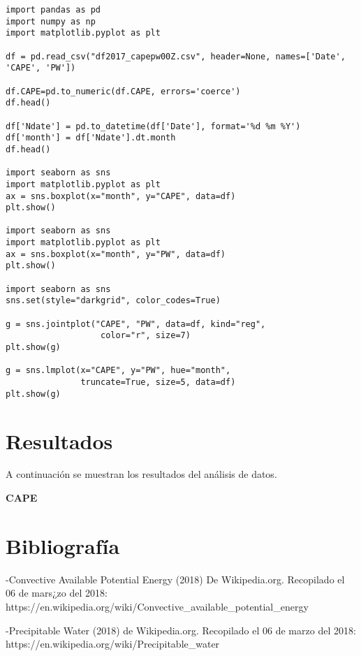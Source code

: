 \documentclass[12pt]{article}
\begin{document}
\begin{verbatim}
import pandas as pd
import numpy as np
import matplotlib.pyplot as plt

df = pd.read_csv("df2017_capepw00Z.csv", header=None, names=['Date', 'CAPE', 'PW'])

df.CAPE=pd.to_numeric(df.CAPE, errors='coerce')
df.head()

df['Ndate'] = pd.to_datetime(df['Date'], format='%d %m %Y')
df['month'] = df['Ndate'].dt.month
df.head()

import seaborn as sns
import matplotlib.pyplot as plt
ax = sns.boxplot(x="month", y="CAPE", data=df)
plt.show()

import seaborn as sns
import matplotlib.pyplot as plt
ax = sns.boxplot(x="month", y="PW", data=df)
plt.show()

import seaborn as sns
sns.set(style="darkgrid", color_codes=True)

g = sns.jointplot("CAPE", "PW", data=df, kind="reg",
                   color="r", size=7)
plt.show(g)

g = sns.lmplot(x="CAPE", y="PW", hue="month",
               truncate=True, size=5, data=df)
plt.show(g)
\end{verbatim}

\section{Resultados}

A continuación se muestran los resultados del análisis de datos.

\textbf{CAPE}


\section{Bibliografía}

-Convective Available Potential Energy (2018) De Wikipedia.org. Recopilado el 06 de mars¿zo del 2018: https://en.wikipedia.org/wiki/Convective\_available\_potential\_energy

-Precipitable Water (2018) de Wikipedia.org. Recopilado el 06 de marzo del 2018: https://en.wikipedia.org/wiki/Precipitable\_water
\end{document}

